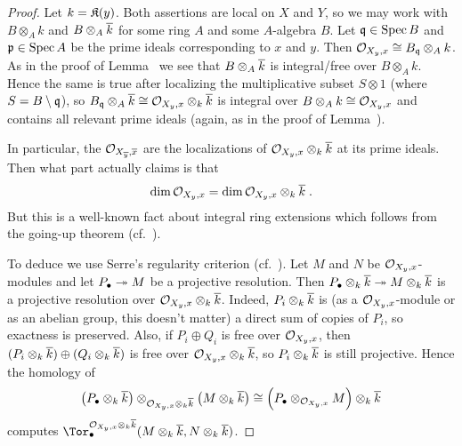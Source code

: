 \documentclass[a4paper,parskip=half,numbers=enddot, DIV=12]{scrreprt}
\begin{document}
\begin{proof}
	Let $k=\mathfrak{K}(y)$. Both assertions are local on $X$ and $Y$, so we may work with $B\otimes_Ak$ and $B\otimes_A\overline{k}$ for some ring $A$ and some $A$-algebra $B$. Let $\mathfrak{q}\in\operatorname{Spec} B$ and $\mathfrak{p}\in\operatorname{Spec} A$ be the prime ideals corresponding to $x$ and $y$. Then $\mathcal{O}_{X_y,x}\cong B_{\mathfrak{q}}\otimes_Ak$. As in the proof of Lemma~ we see that $B\otimes_A\overline{k}$ is integral/free over $B\otimes_Ak$. Hence the same is true after localizing the multiplicative subset $S\otimes 1$ (where $S=B\setminus \mathfrak{q}$), so $B_{\mathfrak{q}}\otimes_A\overline{k}\cong \mathcal{O}_{X_y,x}\otimes_k\overline{k}$ is integral over $B\otimes_Ak\cong \mathcal{O}_{X_y,x}$ and contains all relevant prime ideals (again, as in the proof of Lemma~).
	
	In particular, the $\mathcal{O}_{X_{\overline{y}},\overline{x}}$ are the localizations of $\mathcal{O}_{X_y,x}\otimes_k\overline{k}$ at its prime ideals. Then what part  actually claims is that 
	\begin{align*}
		\dim\mathcal{O}_{X_y,x}=\dim\mathcal{O}_{X_y,x}\otimes_k\overline{k}\;.
	\end{align*}
	But this is a well-known fact about integral ring extensions which follows from the going-up theorem (cf.\ \cite[Theorem~7]{alg1}).
	
	To deduce  we use Serre's regularity criterion (cf.\ \cite[Theorem~1]{homalg}). Let $M$ and $N$ be $\mathcal{O}_{X_y,x}$-modules and let $P_\bullet\epimorphism M$ be a projective resolution. Then $P_\bullet\otimes_k\ov{k}\epimorphism M\otimes_k\ov{k}$ is a projective resolution over $\mathcal{O}_{X_y,x}\otimes_k\overline{k}$. Indeed, $P_i\otimes_k\overline{k}$ is (as a $\mathcal{O}_{X_y,x}$-module or as an abelian group, this doesn't matter) a direct sum of copies of $P_i$, so exactness is preserved. Also, if $P_i\oplus Q_i$ is free over $\mathcal{O}_{X_y,x}$, then $(P_i\otimes_k\overline{k})\oplus (Q_i\otimes_k\overline{k})$ is free over $\mathcal{O}_{X_y,x}\otimes_k\overline{k}$, so $P_i\otimes_k\overline{k}$ is still projective. Hence the homology of 
	\begin{align*}
		\left(P_\bullet\otimes_k\overline{k}\right)\otimes_{\mathcal{O}_{X_y,x}\otimes_k\overline{k}}\left(M\otimes_k\overline{k}\right)\cong \left(P_\bullet\otimes_{\mathcal{O}_{X_y,x}}M\right)\otimes_k\overline{k}
	\end{align*}
	computes $\Tor_\bullet^{\Oo_{X_y,x}\otimes_k\ov{k}}(M\otimes_k\ov{k},N\otimes_k\ov{k})$.
	

\end{proof}
\end{document}
